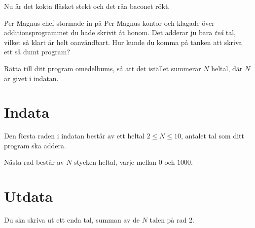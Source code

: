 
Nu är det kokta fläsket stekt och det råa baconet rökt.

Per-Magnus chef stormade in på Per-Magnus kontor och klagade över additionsprogrammet du hade skrivit åt honom. Det adderar ju bara \emph{två} tal, vilket så klart är helt oanvändbart. Hur kunde du komma på tanken att skriva ett så dumt program?

Rätta till ditt program omedelbums, så att det istället summerar $N$ heltal, där $N$ är givet i indatan. 

\section*{Indata}
Den första raden i indatan består av ett heltal $2 \le N \le 10$, antalet tal som ditt program ska addera.

Nästa rad består av $N$ stycken heltal, varje mellan $0$ och $1000$.

\section*{Utdata}

Du ska skriva ut ett enda tal, summan av de $N$ talen på rad 2.
